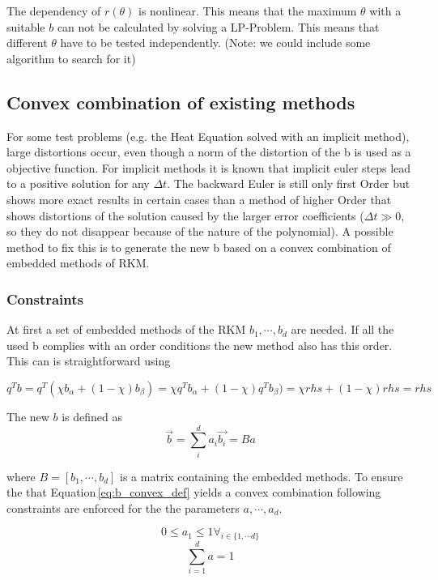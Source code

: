 \documentclass{article}
\begin{document}
The dependency of $r(\theta)$ is nonlinear. This means that the maximum $\theta$ with a suitable $b$ can not be calculated by solving a LP-Problem. This means that different $\theta$ have to be tested independently. 
(Note: we could include some algorithm to search for it)


\subsection{Convex combination of existing methods}\label{sec:convex}
For some test problems (e.g. the Heat Equation solved with an implicit method), large distortions occur, even though a norm of the distortion of the b is used as a objective function. 
For implicit methods it is known that implicit euler steps lead to a positive solution for any $\Delta t$. The backward Euler is still only first Order but shows more exact results in certain cases than a method of higher Order that shows distortions of the solution caused by the larger error coefficients ($\Delta t \gg 0$, so they do not disappear because of the nature of the polynomial).
A possible method to fix this is to generate the new b based on a convex combination of embedded methods of RKM. 

\subsubsection{Constraints}
At first a set of embedded methods of the RKM $b_1,\cdots,b_d$ are needed. 
If all the used b complies with an order conditions the new method also has this order.
This can is straightforward using

$$ q^T b = q^T (\chi b_{\alpha} + (1-\chi) b_{\beta}) = \chi q^T  b_{\alpha} + (1-\chi) q^T  b_{\beta}) = \chi rhs + (1-\chi) rhs = rhs$$

The new $b$ is defined as 
\begin{equation}\label{eq:b_convex_def}
\vec{b} = \sum_i^d a_i \vec{b_i} = Ba
\end{equation}


where $B=\left[b_1,\cdots,b_d \right]$ is a matrix containing the embedded methods.  
To ensure the that Equation\,\ref{eq:b_convex_def} yields a convex combination following constraints are enforced for the  the parameters $a,\cdots,a_d$.

\begin{equation}
 0 \leq a_1 \leq 1  \forall_{i \in \{1, \cdots d \}}
\end{equation}
\begin{equation}
 \sum_{i=1}^d a = 1
\end{equation}
\end{document}
